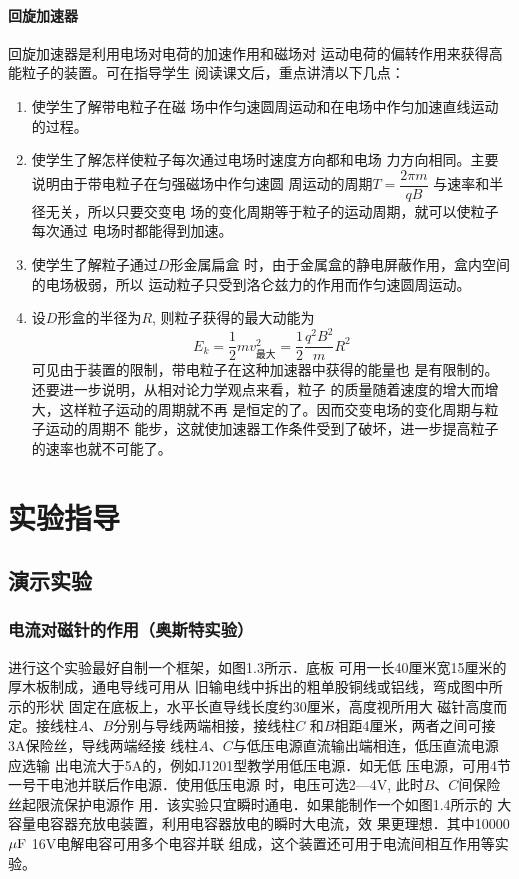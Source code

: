 \paragraph{回旋加速器}
回旋加速器是利用电场对电荷的加速作用和磁场对
运动电荷的偏转作用来获得高能粒子的装置。可在指导学生
阅读课文后，重点讲清以下几点：
\begin{enumerate}
    \item 使学生了解带电粒子在磁
场中作匀速圆周运动和在电场中作匀加速直线运动的过程。
\item 使学生了解怎样使粒子每次通过电场时速度方向都和电场
力方向相同。主要说明由于带电粒子在匀强磁场中作匀速圆
周运动的周期$T=\dfrac{2\pi m}{qB}$
与速率和半径无关，所以只要交变电
场的变化周期等于粒子的运动周期，就可以使粒子每次通过
电场时都能得到加速。
\item 使学生了解粒子通过$D$形金属扁盒
时，由于金属盒的静电屏蔽作用，盒内空间的电场极弱，所以
运动粒子只受到洛仑兹力的作用而作匀速圆周运动。
\item 设$D$形盒的半径为$R$, 则粒子获得的最大动能为
\[E_k=\frac{1}{2}mv^2_{\text{最大}}=\frac{1}{2}\frac{q^2B^2}{m}R^2\]
可见由于装置的限制，带电粒子在这种加速器中获得的能量也
是有限制的。还要进一步说明，从相对论力学观点来看，粒子
的质量随着速度的增大而增大，这样粒子运动的周期就不再
是恒定的了。因而交变电场的变化周期与粒子运动的周期不
能步，这就使加速器工作条件受到了破坏，进一步提高粒子
的速率也就不可能了。
\end{enumerate}

\section{实验指导}
\subsection{演示实验}
\subsubsection{电流对磁针的作用（奥斯特实验）}



进行这个实验最好自制一个框架，如图1.3所示．底板
可用一长40厘米宽15厘米的厚木板制成，通电导线可用从
旧输电线中拆出的粗单股铜线或铝线，弯成图中所示的形状
固定在底板上，水平长直导线长度约30厘米，高度视所用大
磁针高度而定。接线柱$A$、$B$分别与导线两端相接，接线柱$C$
和$B$相距4厘米，两者之间可接3A保险丝，导线两端经接
线柱$A$、$C$与低压电源直流输出端相连，低压直流电源应选输
出电流大于5A的，例如J1201型教学用低压电源．如无低
压电源，可用4节一号干电池并联后作电源．使用低压电源
时，电压可选2—4V, 此时$B$、$C$间保险丝起限流保护电源作
用．该实验只宜瞬时通电．如果能制作一个如图1.4所示的
大容量电容器充放电装置，利用电容器放电的瞬时大电流，效
果更理想．其中10000 $\mu{\rm F}$ 16V电解电容可用多个电容并联
组成，这个装置还可用于电流间相互作用等实验。


